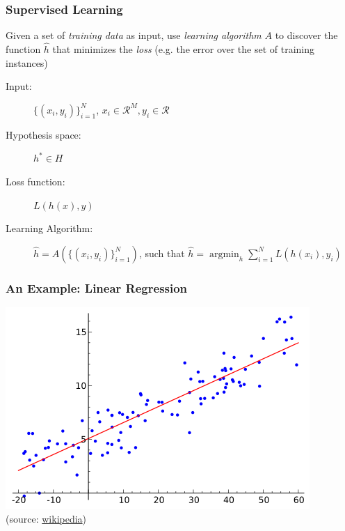 \documentclass{beamer}
\newcommand{\hh}{\hat{h}}
\DeclareMathOperator*{\argmin}{argmin}
\begin{document}
\begin{frame}
    \frametitle{Supervised Learning}

    Given a set of \emph{training data} as input, use \emph{learning algorithm}
    $A$ to discover the function $\hh$ that minimizes the \emph{loss} (e.g. the
    error over the set of training instances) %

    \vfill

    \begin{description}
    \item[Input:] $\{(x_i,y_i)\}_{i=1}^N$, $x_i \in \mathcal{R}^M, y_i \in
        \mathcal{R}$
    \item[Hypothesis space:] $h^* \in H$
    \item[Loss function:] $L(h(x),y)$
    \item[Learning Algorithm:] $\hh = A(\{(x_i,y_i)\}_{i=1}^N)$, such that $\hh
        = \argmin_h \sum_{i=1}^N L(h(x_i),y_i)$
    \end{description}
    \vfill
\end{frame}

\begin{frame}
    \frametitle{An Example: Linear Regression}
    \includegraphics[width=\textwidth]{Linear_regression}\\
    \hfill\footnotesize (source: \href{http://en.wikipedia.org/wiki/Linear_regression}{wikipedia})
\end{frame}
\end{document}
